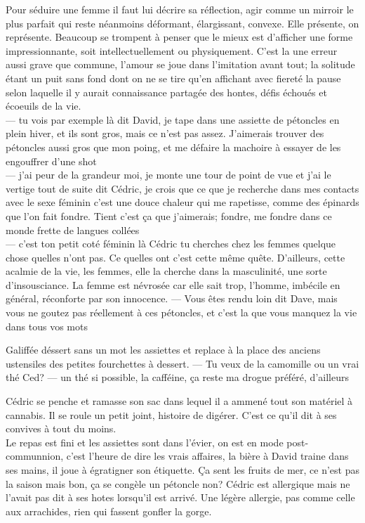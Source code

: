 \documentclass{article}
\begin{document}
Pour séduire une femme il faut lui décrire sa réflection, agir comme un
mirroir le plus parfait qui reste néanmoins déformant, élargissant, convexe.
Elle présente, on représente. Beaucoup se trompent à penser que le mieux est
d'afficher une forme impressionnante, soit intellectuellement ou physiquement.
C'est la une erreur aussi grave que commune, l'amour se joue dans l'imitation
avant tout; la solitude étant un puit sans fond dont on ne se tire qu'en
affichant avec fiereté la pause selon laquelle il y aurait connaissance partagée
des hontes, défis échoués et écoeuils de la vie.\\

--- tu vois par exemple là dit David, je tape dans une assiette de pétoncles
en plein hiver, et ils sont gros, mais ce n'est pas assez. J'aimerais trouver
des pétoncles aussi gros que mon poing, et me défaire la machoire à essayer de les
engouffrer d'une shot\\
--- j'ai peur de la grandeur moi, je monte une tour de point de vue et j'ai le vertige
tout de suite dit Cédric, je crois que ce que je recherche dans mes contacts avec
le sexe féminin c'est une douce chaleur qui me rapetisse, comme des épinards que l'on fait
fondre. Tient c'est ça que j'aimerais; fondre, me fondre dans ce monde frette de langues collées\\
--- c'est ton petit coté féminin là Cédric tu cherches chez les femmes quelque chose
quelles n'ont pas. Ce quelles ont c'est cette même quête. D'ailleurs, cette acalmie
de la vie, les femmes, elle la cherche dans la masculinité, une sorte d'insousciance.
La femme est névrosée car elle sait trop, l'homme, imbécile en général, réconforte
par son innocence.
--- Vous êtes rendu loin dit Dave, mais vous ne goutez pas réellement à ces pétoncles,
et c'est la que vous manquez la vie dans tous vos mots



Galiffée déssert sans un mot les assiettes et replace à la place des anciens ustensiles
des petites fourchettes à dessert.
--- Tu veux de la camomille ou un vrai thé Ced?
--- un thé si possible, la cafféine, ça reste ma drogue préféré, d'ailleurs

Cédric se penche et ramasse son sac dans lequel il a ammené tout son matériel
à cannabis. Il se roule un petit joint, histoire de digérer. C'est ce qu'il dit
à ses convives à tout du moins.\\

Le repas est fini et les assiettes sont dans l'évier, on est en mode post-communnion,
c'est l'heure de dire les vrais affaires, la bière à David traine dans ses mains, il
joue à égratigner son étiquette. Ça sent les fruits de mer, ce n'est pas la saison mais
bon, ça se congèle un pétoncle non? Cédric est allergique mais ne l'avait pas dit à ses
hotes lorsqu'il est arrivé. Une légère allergie, pas comme celle aux arrachides, rien
qui fassent gonfler la gorge. \\
\end{document}

